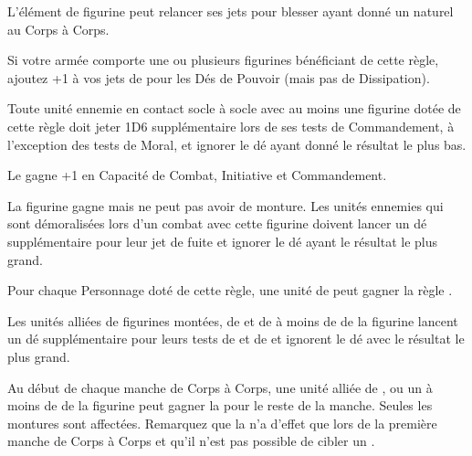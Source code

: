 {{{{{{{{

\startarmyspecialrules

\armyspecialruleentry{\killerinstinct}

L'élément de figurine peut relancer ses jets pour blesser ayant donné un  naturel au Corps à Corps.

\armyspecialruleentry{\masterofthedarkarts}

Si votre armée comporte une ou plusieurs figurines bénéficiant de cette règle, ajoutez +1 à vos jets de \channel{} pour les Dés de Pouvoir (mais pas de Dissipation).

\armyspecialruleentry{\auraofdespair}

Toute unité ennemie en contact socle à socle avec au moins une figurine dotée de cette règle doit jeter 1D6 supplémentaire lors de ses tests de Commandement, à l'exception des tests de Moral, et ignorer le dé ayant donné le résultat le plus bas.

\armyspecialruleentry{\alphapredator}

Le \monster{} gagne +1 en Capacité de Combat, Initiative et Commandement.

\begin{multicols}{2}\raggedcolumns
\armyspecialruleentry{\fleetcommander}

La figurine gagne  mais ne peut pas avoir de monture. Les unités ennemies qui sont démoralisées lors d'un combat avec cette figurine doivent lancer un dé supplémentaire pour leur jet de fuite et ignorer le dé ayant le résultat le plus grand.

Pour chaque Personnage doté de cette règle, une unité de \corsairs{} peut gagner la règle \vanguard{}.

\columnbreak
\armyspecialruleentry{\beastmaster}

Les unités alliées de figurines montées, de \monsters{} et de \warbeasts{} à moins de  de la figurine lancent un dé supplémentaire pour leurs tests de \frenzy{} et de \stupidity{} et ignorent le dé avec le résultat le plus grand.

Au début de chaque manche de Corps à Corps, une unité alliée de \cavalry{}, \monstrouscavalry{} ou un \monster{} à moins de  de la figurine peut gagner la \hatred{} pour le reste de la manche. Seules les montures sont affectées. Remarquez que la \hatred{} n'a d'effet que lors de la première manche de Corps à Corps et qu'il n'est pas possible de cibler un \riddenmonster{}.


\end{multicols}}}}}}}}}
